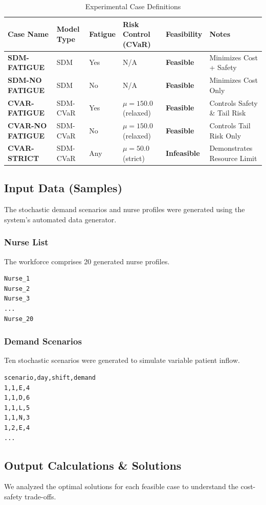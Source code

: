 \documentclass[10pt,a4paper,twocolumn]{article}
\renewcommand{\arraystretch}{1.2}
\begin{document}
\begin{table}[h!]
\centering
\renewcommand{\arraystretch}{1.5}
\caption{Experimental Case Definitions} \label{tab:case_specifics}
\begin{tabularx}{\textwidth}{@{}lllllX@{}}
\toprule
\textbf{Case Name} & \textbf{Model Type} & \textbf{Fatigue} & \textbf{Risk Control (CVaR)} & \textbf{Feasibility} & \textbf{Notes} \\ \midrule
\textbf{SDM-FATIGUE} & SDM & Yes & N/A & \textbf{Feasible} & Minimizes Cost + Safety \\
\textbf{SDM-NO FATIGUE} & SDM & No & N/A & \textbf{Feasible} & Minimizes Cost Only \\
\textbf{CVAR-FATIGUE} & SDM-CVaR & Yes & $\mu=150.0$ (relaxed) & \textbf{Feasible} & Controls Safety \& Tail Risk \\
\textbf{CVAR-NO FATIGUE} & SDM-CVaR & No & $\mu=150.0$ (relaxed) & \textbf{Feasible} & Controls Tail Risk Only \\
\textbf{CVAR-STRICT} & SDM-CVaR & Any & $\mu=50.0$ (strict) & \textbf{Infeasible} & Demonstrates Resource Limit \\ \bottomrule
\end{tabularx}
\end{table}

\subsection{Input Data (Samples)}
The stochastic demand scenarios and nurse profiles were generated using the system's automated data generator.
\subsubsection{Nurse List}
The workforce comprises 20 generated nurse profiles.
\begin{verbatim}
Nurse_1
Nurse_2
Nurse_3
...
Nurse_20
\end{verbatim}
\subsubsection{Demand Scenarios}
Ten stochastic scenarios were generated to simulate variable patient inflow.
\begin{verbatim}
scenario,day,shift,demand
1,1,E,4
1,1,D,6
1,1,L,5
1,1,N,3
1,2,E,4
...
\end{verbatim}

\subsection{Output Calculations \& Solutions}
We analyzed the optimal solutions for each feasible case to understand the cost-safety trade-offs.
\end{document}
